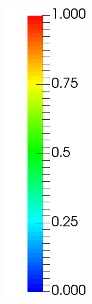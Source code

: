 \documentclass[14pt]{beamer}
\begin{document}
\begin{frame}
\begin{columns}
      \begin{column}{0.1\textwidth}
        \includegraphics[width=\textwidth]{images/legend_weight_pot.png}
      \end{column}


\end{columns}
\end{frame}
\end{document}
